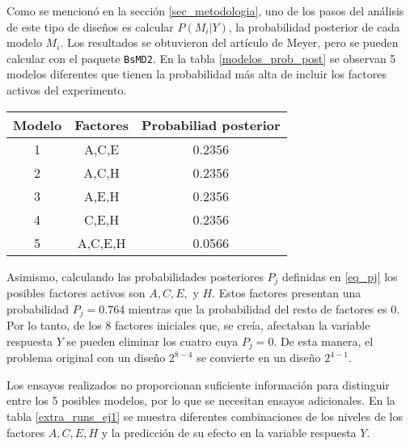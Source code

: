 Como se mencionó en la sección \ref{sec_metodologia}, uno de los pasos del análisis de este tipo de diseños es calcular $P(M_i | Y)$, la probabilidad posterior de cada modelo $M_i$. Los resultados se obtuvieron del artículo de Meyer, pero se pueden calcular con el paquete \texttt{BsMD2}. En la tabla \ref{modelos_prob_post} se observan 5 modelos diferentes que tienen la probabilidad más alta de incluir los factores activos del experimento. 

\begin{center}
	\begin{tabular}{ccc}
		Modelo & Factores & Probabiliad posterior \\
		\hline
		1 & A,C,E & 0.2356 \\
		
		2 & A,C,H & 0.2356 \\
		
		3 & A,E,H & 0.2356 \\
		
		4 & C,E,H & 0.2356 \\
		
		5 & A,C,E,H & 0.0566 \\
		
	\end{tabular}
	 \label{modelos_prob_post}
\end{center}

Asimismo, calculando las probabilidades posteriores $P_j$ definidas en \ref{eq_pj} los posibles factores activos son $A, C, E,$ y $H$. Estos factores presentan una probabilidad $P_j = 0.764$ mientras que la probabilidad del resto de factores es $0$. Por lo tanto, de los 8 factores iniciales que, se creía, afectaban la variable respuesta $Y$ se pueden eliminar los cuatro cuya $P_j = 0$. De esta manera, el problema original con un diseño $2^{8-4}$ se convierte en un diseño $2^{4-1}$. 

Los ensayos realizados no proporcionan suficiente información para distinguir entre los 5 posibles modelos, por lo que se necesitan ensayos adicionales. En la tabla \ref{extra_runs_ej1} se muestra diferentes combinaciones de los niveles de los factores $A, C, E, H$ y la predicción de su efecto en la variable respuesta $Y$. 

